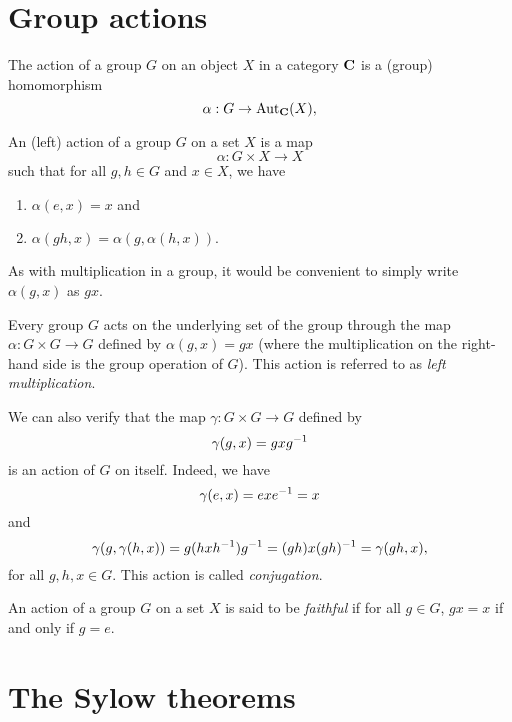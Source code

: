 \section{Group actions}

\begin{definition}
    The action of a group \(G\) on an object \(X\) in a category \(\mathbf{C}\) is
    a (group) homomorphism
    \[
        \alpha: G \to \operatorname{Aut}_{\mathbf{C}}(X),
    \]
\end{definition}

\begin{definition}
    An (left) action of a group \(G\) on a set \(X\) is a map
    \[
        \alpha: G \times X \to X
    \]
    such that for all \(g, h \in G\) and \(x \in X\), we have
    \begin{enumerate}[label=(\alph*)]
        \item \(\alpha(e, x) = x\) and
        \item \(\alpha(gh, x) = \alpha(g, \alpha(h, x)).\)
    \end{enumerate}

    As with multiplication in a group, it would be convenient to simply write
    \(\alpha(g, x)\) as \(gx\).
\end{definition}

\begin{example}
    Every group \(G\) acts on the underlying set of the group through the map
    \(\alpha: G \times G \to G\) defined by \(\alpha(g, x) = gx\) (where the
    multiplication on the right-hand side is the group operation of \(G\)). This
    action is referred to as \emph{left multiplication}.

    We can also verify that the map \(\gamma: G \times G \to G\) defined by
    \[
        \gamma(g, x) = gxg^{-1}
    \]
    is an action of \(G\) on itself. Indeed, we have
    \[
        \gamma(e, x) = exe^{-1} = x
    \]
    and
    \[
        \gamma(g, \gamma(h, x)) = g(hxh^{-1})g^{-1} = (gh)x(gh)^{-1} = \gamma(gh, x),
    \]
    for all \(g, h, x \in G\). This action is called \emph{conjugation}.
\end{example}

\begin{sectionthm}
    An action of a group \(G\) on a set \(X\) is said to be \emph{faithful} if
    for all \(g \in G\), \(gx = x\) if and only if \(g = e\).
\end{sectionthm}

\section{The Sylow theorems}